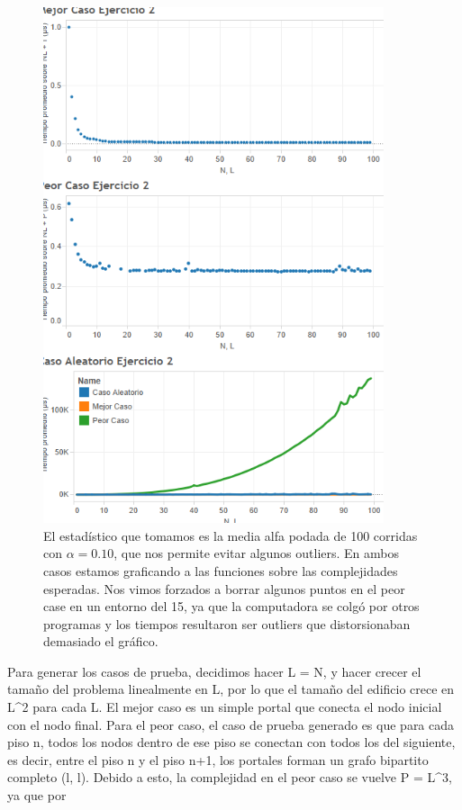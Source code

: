 \documentclass{article}
\theoremstyle{definition}
\theoremstyle{remark}
\begin{document}
\begin{figure}
\centering
\centerline{\includegraphics[width=10cm]{ex2}}
\caption{El estadístico que tomamos es la media alfa podada de 100 corridas con $\alpha = 0.10$, que nos permite evitar algunos outliers. En ambos casos estamos graficando a las funciones sobre las complejidades esperadas. Nos vimos forzados a borrar algunos puntos en el peor case en un entorno del 15, ya que la computadora se colgó por otros programas y los tiempos resultaron ser outliers que distorsionaban demasiado el gráfico.\label{grf:ex2}}
\end{figure}

Para generar los casos de prueba, decidimos hacer L = N, y hacer crecer el tamaño del problema
linealmente en L, por lo que el tamaño del edificio crece en L^2 para cada L. El mejor caso es un simple portal que conecta el nodo inicial con el nodo final. Para el peor caso, el caso de prueba generado es que para cada piso n, todos los nodos dentro de ese piso se conectan con todos los del siguiente, es decir, entre el piso n y el piso n+1, los portales forman un grafo bipartito completo (l, l). Debido a esto, la complejidad en el peor caso se vuelve P = L^3, ya que por 
\end{document}
